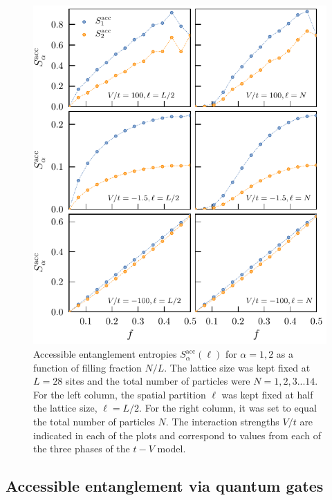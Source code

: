 	\begin{figure}[h!]
	\begin{center}
	\includegraphics[scale=1.0]{fillingFractionDependence.pdf}
	\end{center}
	\caption{Accessible entanglement entropies $S_{\alpha}^{\mathrm{acc}}(\ell)$ for $		\alpha = 1,2$ as a function of filling fraction $N/L$. The lattice size was kept fixed at 		$L=28$ sites and the total number of particles were $N=1,2,3...14$. For the left column, 	the spatial partition $\ell$ was kept fixed at half the lattice size, $\ell = L/2$. For the right 	column, it was set to equal the total number of particles $N$. The interaction strengths 	$V/t$ are indicated in each of the plots and correspond to values from each of the three 	phases of the $t-V$ model.}
	\label{fig:fillingFractionDependence}
	\end{figure}
	
	\subsection{Accessible entanglement via quantum gates}
	
